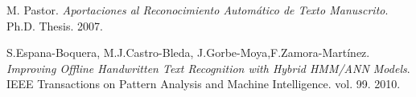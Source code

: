 \documentclass[a4paper]{article}
\begin{document}
\begin{thebibliography}{9}
 M. Pastor. \emph{Aportaciones al Reconocimiento Automático de Texto Manuscrito}. Ph.D. Thesis. 2007.

 S.Espana-Boquera, M.J.Castro-Bleda, J.Gorbe-Moya,F.Zamora-Martínez. \emph{Improving Offline Handwritten Text Recognition with Hybrid HMM/ANN Models}. IEEE Transactions on Pattern Analysis and Machine Intelligence. vol. 99. 2010.
\end{thebibliography}
\end{document}
